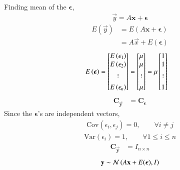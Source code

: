 \documentclass[journal,12pt,onecolumn]{IEEEtran}
\providecommand{\mtx}[1]{\mathbf{#1}}
\theoremstyle{remark}
\begin{document}
Finding mean of the ${\boldsymbol{\epsilon}}$,
\begin{align}
\vec{y}=A\mtx{\boldsymbol{x}}+\boldsymbol{\epsilon}
\end{align}
\begin{align}
E(\vec{y})&=E(A\mtx{\boldsymbol{x}}+\boldsymbol{\epsilon})\\
&=A\vec{x}+E(\boldsymbol{\epsilon})
\end{align}
\begin{align}
\nonumber E\brak{\boldsymbol{{\epsilon}}} = \begin{bmatrix}
E\brak{{\epsilon}_1} \\%
E\brak{{\epsilon}_2} \\%
. \\[-10pt]
. \\[-10pt]
. \\[5pt]
E\brak{{\epsilon}_n}
\end{bmatrix}&=\begin{bmatrix}
\mu \\%
\mu \\%
. \\[-10pt]
. \\[-10pt]
. \\[5pt]
\mu
\end{bmatrix}=\mu \begin{bmatrix}
1 \\%
1 \\%
. \\[-10pt]
. \\[-10pt]
. \\[5pt]
1
\end{bmatrix}
\end{align}
\begin{align}
 \mathbf{C_{\vec{y}}}&=\mathbf{C_{\boldsymbol{\epsilon}}}
 \end{align}
 Since the $\boldsymbol{\epsilon}$'s are independent vectors, 
\begin{align}
\textrm{Cov}({\epsilon}_i,{\epsilon}_j)=0 , \qquad \forall i\neq j
\end{align}
\begin{align}
\textrm{Var}({\epsilon}_i)=1 , \qquad \forall 1\leq i\leq n
\end{align}
\begin{align}
 \mathbf{C_{\vec{y}}}&=I_{n\times n}
 \end{align}
\begin{align}
\mathbf{y} \sim \mathcal{N}\left(A\mathbf{x}+E({\boldsymbol{\epsilon}}),I\right)
\end{align}
\end{document}
